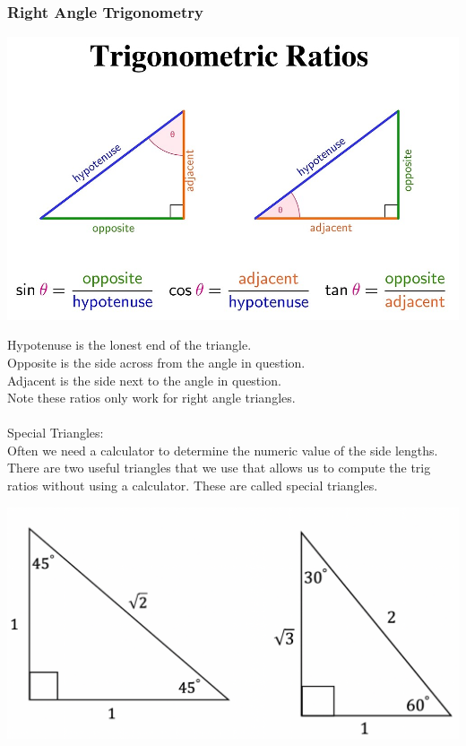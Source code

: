 \documentclass[11pt, fleqn]{article}
\begin{document}
\subsubsection{Right Angle Trigonometry}
\centerline{\includegraphics[scale=0.3]{FundamentalsPictures/TrigRatios.jpg}}
Hypotenuse is the lonest end of the triangle.\\
Opposite is the side across from the angle in question.\\
Adjacent is the side next to the angle in question.\\
Note these ratios only work for right angle triangles.\\
\\
Special Triangles:\\
Often we need a calculator to determine the numeric value of the side lengths. There are two useful triangles that we use that allows us to compute the trig ratios without using a calculator. These are called special triangles.\\
\centerline{\includegraphics[scale=0.5]{FundamentalsPictures/SpecialTriangles.png}}
\end{document}
